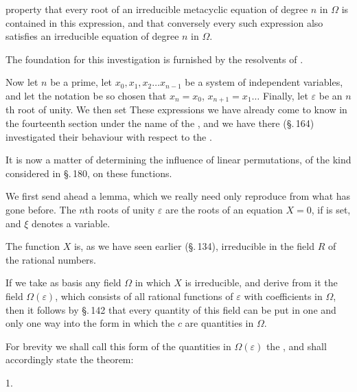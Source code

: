 property that every root of an irreducible metacyclic equation of degree $n$ in $\Omega$ is contained in this expression, and that conversely every such expression also satisfies an irreducible equation of degree $n$ in $\Omega$.

The foundation for this investigation is furnished by the resolvents of .

Now let $n$ be a prime, let $x_0, x_1, x_2 \ldots x_{n-1}$ be a system of independent variables, and let the notation be so chosen that $x_n = x_0$, $x_{n+1} = x_1 \ldots$ Finally, let $\varepsilon$ be an $n$th root of unity. We then set
These expressions we have already come to know in the fourteenth section under the name of the , and we have there (\S.\,164) investigated their behaviour with respect to the .

It is now a matter of determining the influence of linear permutations, of the kind considered in \S.\,180, on these functions.

We first send ahead a lemma, which we really need only reproduce from what has gone before. The  $n$th roots of unity $\varepsilon$ are the roots of an equation $X = 0$, if
is set, and $\xi$ denotes a variable.

The function $X$ is, as we have seen earlier (\S.\,134), irreducible in the field $R$ of the rational numbers.

If we take as basis any field $\Omega$ in which $X$ is irreducible, and derive from it the field $\Omega(\varepsilon)$, which consists of all rational functions of $\varepsilon$ with coefficients in $\Omega$, then it follows by \S.\,142 that every quantity of this field can be put in one and only one way into the form
in which the $c$ are quantities in $\Omega$.

For brevity we shall call this form of the quantities in $\Omega(\varepsilon)$ the , and shall accordingly state the theorem:

1. 
